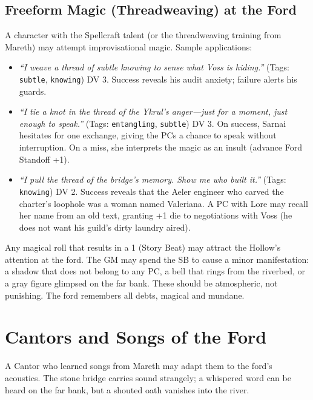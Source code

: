 \documentclass[10pt,twoside]{book}
\begin{document}
\subsection*{Freeform Magic (Threadweaving) at the Ford}

A character with the Spellcraft talent (or the threadweaving training from Mareth) may attempt improvisational magic. Sample applications:

\begin{itemize}
\item \textit{``I weave a thread of subtle knowing to sense what Voss is hiding.''} (Tags: \texttt{subtle}, \texttt{knowing}) DV 3. Success reveals his audit anxiety; failure alerts his guards.
\item \textit{``I tie a knot in the thread of the Ykrul's anger---just for a moment, just enough to speak.''} (Tags: \texttt{entangling}, \texttt{subtle}) DV 3. On success, Sarnai hesitates for one exchange, giving the PCs a chance to speak without interruption. On a miss, she interprets the magic as an insult (advance Ford Standoff +1).
\item \textit{``I pull the thread of the bridge's memory. Show me who built it.''} (Tags: \texttt{knowing}) DV 2. Success reveals that the Aeler engineer who carved the charter's loophole was a woman named Valeriana. A PC with Lore may recall her name from an old text, granting +1 die to negotiations with Voss (he does not want his guild's dirty laundry aired).
\end{itemize}

\begin{tipsbox}
Any magical roll that results in a 1 (Story Beat) may attract the Hollow's attention at the ford. The GM may spend the SB to cause a minor manifestation: a shadow that does not belong to any PC, a bell that rings from the riverbed, or a gray figure glimpsed on the far bank. These should be atmospheric, not punishing. The ford remembers all debts, magical and mundane.
\end{tipsbox}

\section*{Cantors and Songs of the Ford}

A Cantor who learned songs from Mareth may adapt them to the ford's acoustics. The stone bridge carries sound strangely; a whispered word can be heard on the far bank, but a shouted oath vanishes into the river.
\end{document}
